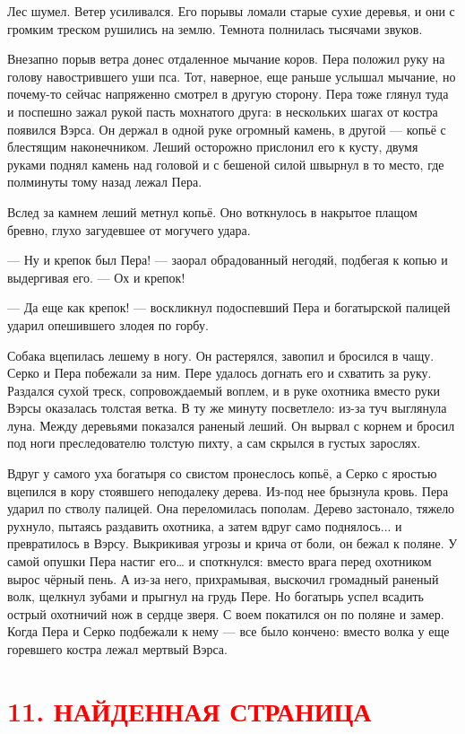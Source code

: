 \documentclass[oneside,final,14pt]{extreport}
\begin{document}
	Лес шумел. Ветер усиливался. Его порывы ломали старые сухие деревья, и они с громким треском рушились на землю. Темнота полнилась тысячами звуков.
	
	Внезапно порыв ветра донес отдаленное мычание коров. Пера положил руку на голову навострившего уши пса. Тот, наверное, еще раньше услышал мычание, но почему-то сейчас напряженно смотрел в другую сторону. Пера тоже глянул туда и поспешно зажал рукой пасть мохнатого друга: в нескольких шагах от костра появился Вэрса. Он держал в одной руке огромный камень, в другой — копьё с блестящим наконечником. Леший осторожно прислонил его к кусту, двумя руками поднял камень над головой и с бешеной силой швырнул в то место, где полминуты тому назад лежал Пера.
	
	Вслед за камнем леший метнул копьё. Оно воткнулось в накрытое плащом бревно, глухо загудевшее от могучего удара.
	
	— Ну и крепок был Пера! — заорал обрадованный негодяй, подбегая к копью и выдергивая его. — Ох и крепок!
	
	— Да еще как крепок! — воскликнул подоспевший Пера и богатырской палицей ударил опешившего злодея по горбу.
	
	Собака вцепилась лешему в ногу. Он растерялся, завопил и бросился в чащу. Серко и Пера побежали за ним. Пере удалось догнать его и схватить за руку. Раздался сухой треск, сопровождаемый воплем, и в руке охотника вместо руки Вэрсы оказалась толстая ветка. В ту же минуту посветлело: из-за туч выглянула луна. Между деревьями показался раненый леший. Он вырвал с корнем и бросил под ноги преследователю толстую пихту, а сам скрылся в густых зарослях.
	
	Вдруг у самого уха богатыря со свистом пронеслось копьё, а Серко с яростью вцепился в кору стоявшего неподалеку дерева. Из-под нее брызнула кровь. Пера ударил по стволу палицей. Она переломилась пополам. Дерево застонало, тяжело рухнуло, пытаясь раздавить охотника, а затем вдруг само поднялось... и превратилось в Вэрсу. Выкрикивая угрозы и крича от боли, он бежал к поляне. У самой опушки Пера настиг его… и споткнулся: вместо врага перед охотником вырос чёрный пень. А из-за него, прихрамывая, выскочил громадный раненый волк, щелкнул зубами и прыгнул на грудь Пере. Но богатырь успел всадить острый охотничий нож в сердце зверя. С воем покатился он по поляне и замер. Когда Пера и Серко подбежали к нему — все было кончено: вместо волка у еще горевшего костра лежал мертвый Вэрса.
	
	\section[11. Найденная страница]{\center \textcolor{red}{11. НАЙДЕННАЯ СТРАНИЦА}}
\end{document}

